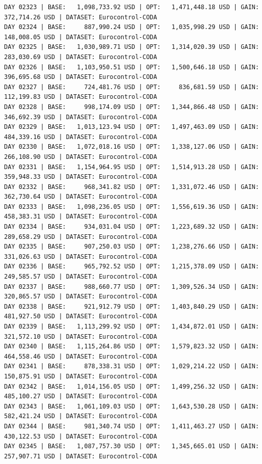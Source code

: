 \documentclass[11pt,a4paper]{article}
\begin{document}
\begin{verbatim}
DAY 02323 | BASE:   1,098,733.92 USD | OPT:   1,471,448.18 USD | GAIN: 372,714.26 USD | DATASET: Eurocontrol-CODA
DAY 02324 | BASE:     887,990.24 USD | OPT:   1,035,998.29 USD | GAIN: 148,008.05 USD | DATASET: Eurocontrol-CODA
DAY 02325 | BASE:   1,030,989.71 USD | OPT:   1,314,020.39 USD | GAIN: 283,030.69 USD | DATASET: Eurocontrol-CODA
DAY 02326 | BASE:   1,103,950.51 USD | OPT:   1,500,646.18 USD | GAIN: 396,695.68 USD | DATASET: Eurocontrol-CODA
DAY 02327 | BASE:     724,481.76 USD | OPT:     836,681.59 USD | GAIN: 112,199.83 USD | DATASET: Eurocontrol-CODA
DAY 02328 | BASE:     998,174.09 USD | OPT:   1,344,866.48 USD | GAIN: 346,692.39 USD | DATASET: Eurocontrol-CODA
DAY 02329 | BASE:   1,013,123.94 USD | OPT:   1,497,463.09 USD | GAIN: 484,339.16 USD | DATASET: Eurocontrol-CODA
DAY 02330 | BASE:   1,072,018.16 USD | OPT:   1,338,127.06 USD | GAIN: 266,108.90 USD | DATASET: Eurocontrol-CODA
DAY 02331 | BASE:   1,154,964.95 USD | OPT:   1,514,913.28 USD | GAIN: 359,948.33 USD | DATASET: Eurocontrol-CODA
DAY 02332 | BASE:     968,341.82 USD | OPT:   1,331,072.46 USD | GAIN: 362,730.64 USD | DATASET: Eurocontrol-CODA
DAY 02333 | BASE:   1,098,236.05 USD | OPT:   1,556,619.36 USD | GAIN: 458,383.31 USD | DATASET: Eurocontrol-CODA
DAY 02334 | BASE:     934,031.04 USD | OPT:   1,223,689.32 USD | GAIN: 289,658.29 USD | DATASET: Eurocontrol-CODA
DAY 02335 | BASE:     907,250.03 USD | OPT:   1,238,276.66 USD | GAIN: 331,026.63 USD | DATASET: Eurocontrol-CODA
DAY 02336 | BASE:     965,792.52 USD | OPT:   1,215,378.09 USD | GAIN: 249,585.57 USD | DATASET: Eurocontrol-CODA
DAY 02337 | BASE:     988,660.77 USD | OPT:   1,309,526.34 USD | GAIN: 320,865.57 USD | DATASET: Eurocontrol-CODA
DAY 02338 | BASE:     921,912.79 USD | OPT:   1,403,840.29 USD | GAIN: 481,927.50 USD | DATASET: Eurocontrol-CODA
DAY 02339 | BASE:   1,113,299.92 USD | OPT:   1,434,872.01 USD | GAIN: 321,572.10 USD | DATASET: Eurocontrol-CODA
DAY 02340 | BASE:   1,115,264.86 USD | OPT:   1,579,823.32 USD | GAIN: 464,558.46 USD | DATASET: Eurocontrol-CODA
DAY 02341 | BASE:     878,338.31 USD | OPT:   1,029,214.22 USD | GAIN: 150,875.91 USD | DATASET: Eurocontrol-CODA
DAY 02342 | BASE:   1,014,156.05 USD | OPT:   1,499,256.32 USD | GAIN: 485,100.27 USD | DATASET: Eurocontrol-CODA
DAY 02343 | BASE:   1,061,109.03 USD | OPT:   1,643,530.28 USD | GAIN: 582,421.24 USD | DATASET: Eurocontrol-CODA
DAY 02344 | BASE:     981,340.74 USD | OPT:   1,411,463.27 USD | GAIN: 430,122.53 USD | DATASET: Eurocontrol-CODA
DAY 02345 | BASE:   1,087,757.30 USD | OPT:   1,345,665.01 USD | GAIN: 257,907.71 USD | DATASET: Eurocontrol-CODA

\end{verbatim}
\end{document}
